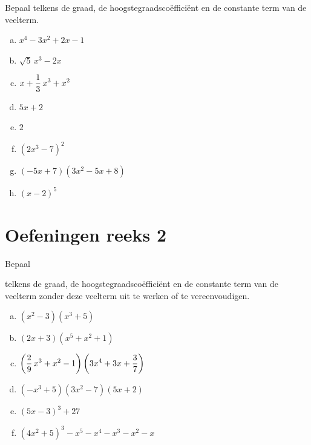 \documentclass{ximera}
\begin{document}
\begin{exercise} 
Bepaal telkens de graad, de hoogstegraadsco\"effici\"ent en de constante term van de veelterm.
\begin{multicols}{2}
\begin{enumerate}[(a)]
\item
$x^4-3x^2+2x-1$
\item
$\sqrt{5}\,x^3-2x$
\item
$\displaystyle x+\frac{1}{3}\,x^3+x^2$
\item
$5x+2$
\item
$2$
\item
$(2x^3-7)^2$
\item
$(-5x+7)(3x^2-5x+8)$
\item
$(x-2)^5$
\end{enumerate}
\end{multicols}
\end{exercise} 














\section*{Oefeningen reeks 2}

\begin{exercise} 
\hypertarget{oef1.5}{Bepaal} telkens de graad, de hoogstegraadsco\"effici\"ent en de constante term van de veelterm zonder deze veelterm uit te werken of te vereenvoudigen. 
\begin{multicols}{2}
\begin{enumerate}[(a)]
\item
$(x^2-3)(x^3+5)$
\item
$(2x+3)(x^5+x^2+1)$
\item
$\displaystyle \left(\frac{2}{9}\,x^3+x^2-1\right)\left(3x^4+3x+\frac{3}{7}\right)$
\item
$(-x^3+5)(3x^2-7)(5x+2)$
\item
$(5x-3)^3+27$
\item
$(4x^2+5)^3-x^5-x^4-x^3-x^2-x$
\end{enumerate}
\end{multicols}
\end{exercise} 

\pagebreak
\end{document}
